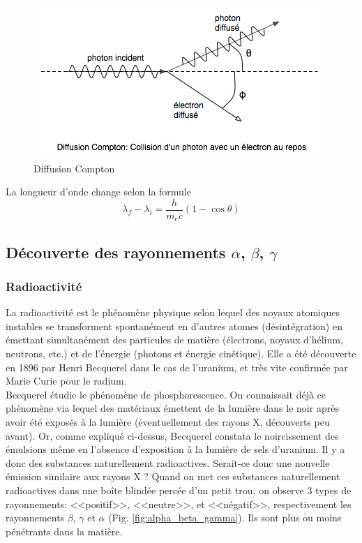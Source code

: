 \begin{figure}[ht]
    \centering
    \includegraphics[scale=0.60]{Images1/compton.png}
    \caption{Diffusion Compton}
\end{figure}

La longueur d'onde change selon la formule
\[
    \lambda_f-\lambda_i=\dfrac{h}{m_ec}(1-\cos{\theta})
\]


\subsection{Découverte des rayonnements $\alpha$, $\beta$, $\gamma$}
\subsubsection{Radioactivité}

La radioactivité est le phénomène physique selon lequel des noyaux atomiques instables se transforment spontanément en d'autres atomes (désintégration) en émettant simultanément des particules de matière (électrons, noyaux d'hélium, neutrons, etc.) et de l'énergie (photons et énergie cinétique). Elle a été découverte en 1896 par Henri Becquerel dans le cas de l'uranium, et très vite confirmée par Marie Curie pour le radium. \\

Becquerel étudie le phénomène de phosphorescence. On connaissait déjà ce phénomène via lequel des matériaux émettent de la lumière dans le noir après avoir été exposés à la lumière (éventuellement des rayons X, découverts peu avant). Or, comme expliqué ci-dessus, Becquerel constata le noircissement des émulsions même en l'absence d'exposition à la lumière de sels d'uranium. Il y a donc des substances naturellement radioactives. Serait-ce donc une nouvelle émission similaire aux rayons X ? Quand on met ces substances naturellement radioactives dans une boîte blindée percée d'un petit trou, on observe 3 types de rayonnements: <<positif>>, <<neutre>>, et <<négatif>>, respectivement les rayonnements $\beta$, $\gamma$ et $\alpha$ (Fig. \ref{fig:alpha_beta_gamma}). Ils sont plus ou moins pénétrants dans la matière.

